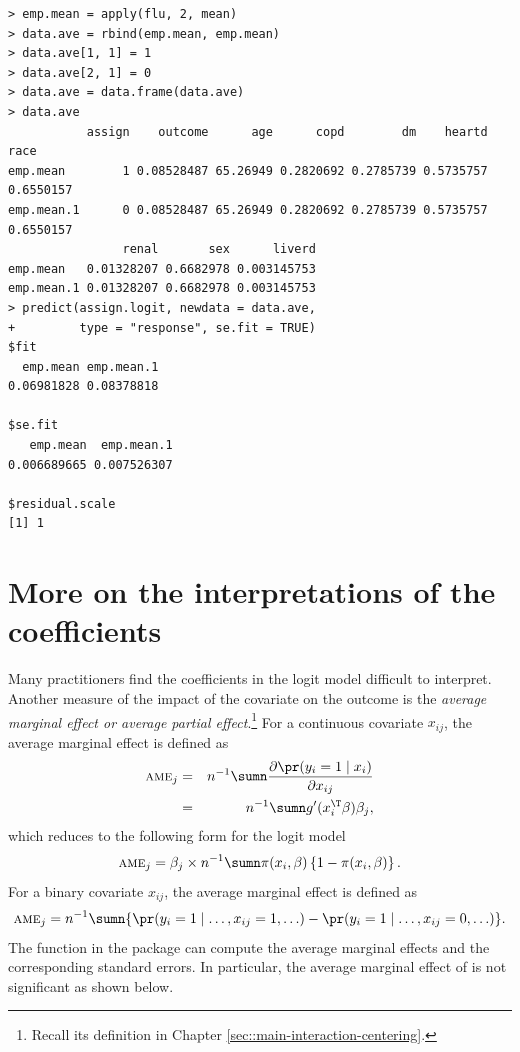 \begin{lstlisting}
> emp.mean = apply(flu, 2, mean)
> data.ave = rbind(emp.mean, emp.mean)
> data.ave[1, 1] = 1
> data.ave[2, 1] = 0
> data.ave = data.frame(data.ave)
> data.ave
           assign    outcome      age      copd        dm    heartd      race
emp.mean        1 0.08528487 65.26949 0.2820692 0.2785739 0.5735757 0.6550157
emp.mean.1      0 0.08528487 65.26949 0.2820692 0.2785739 0.5735757 0.6550157
                renal       sex      liverd
emp.mean   0.01328207 0.6682978 0.003145753
emp.mean.1 0.01328207 0.6682978 0.003145753
> predict(assign.logit, newdata = data.ave,
+         type = "response", se.fit = TRUE)
$fit
  emp.mean emp.mean.1 
0.06981828 0.08378818 

$se.fit
   emp.mean  emp.mean.1 
0.006689665 0.007526307 

$residual.scale
[1] 1
\end{lstlisting}



\section{More on the interpretations of the coefficients}


Many practitioners find the coefficients in the logit model difficult to interpret. Another measure of the impact of the covariate on the outcome is the {\it average marginal effect or average partial effect}.\footnote{Recall its definition in Chapter \ref{sec::main-interaction-centering}.} For a continuous covariate $x_{ij}$, the average marginal effect is defined as 
\begin{eqnarray*}
\textsc{ame}_j 
&=& 
n^{-1}\sumn\frac{\partial\pr(y_{i}=1\mid x_{i})}{\partial x_{ij}} \\
&=& 
n^{-1}\sumn g'(x_{i}^{\T}\beta)\beta_{j},
\end{eqnarray*}
which reduces to the following form for the logit model
\[
\textsc{ame}_j = 
\beta_{j}\times n^{-1}\sumn\pi(x_{i},\beta)\left\{ 1-\pi(x_{i},\beta)\right\} .
\]
For a binary covariate $x_{ij}$, the average marginal effect is defined as 
$$
\textsc{ame}_j = 
n^{-1}\sumn  \{  \pr(y_{i}=1\mid  \ldots, x_{ij}=1, \ldots) - \pr(y_{i}=1\mid  \ldots, x_{ij}=0, \ldots )  \} . 
$$
The  function in the  package can compute the average marginal effects and the corresponding standard errors. In particular, the average marginal effect of  is not significant as shown below. 



